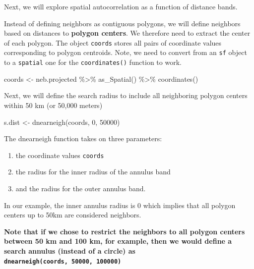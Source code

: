 \documentclass[]{article}
\newenvironment{Shaded}{\begin{snugshade}}{\end{snugshade}}
\newcommand{\DecValTok}[1]{\textcolor[rgb]{0.00,0.00,0.81}{#1}}
\newcommand{\FunctionTok}[1]{\textcolor[rgb]{0.00,0.00,0.00}{#1}}
\newcommand{\NormalTok}[1]{#1}
\newcommand{\OtherTok}[1]{\textcolor[rgb]{0.56,0.35,0.01}{#1}}
\newcommand{\SpecialCharTok}[1]{\textcolor[rgb]{0.00,0.00,0.00}{#1}}
\begin{document}
Next, we will explore spatial autocorrelation as a function of distance
bands.

Instead of defining neighbors as contiguous polygons, we will define
neighbors based on distances to \textbf{polygon centers}. We therefore
need to extract the center of each polygon. The object \texttt{coords}
stores all pairs of coordinate values corresponding to polygon
centroids. Note, we need to convert from an \texttt{sf} object to a
\texttt{spatial} one for the \texttt{coordinates()} function to work.

\begin{Shaded}
\begin{Highlighting}[]
\NormalTok{coords }\OtherTok{\textless{}{-}}\NormalTok{ neb.projected }\SpecialCharTok{\%\textgreater{}\%} \FunctionTok{as\_Spatial}\NormalTok{() }\SpecialCharTok{\%\textgreater{}\%} \FunctionTok{coordinates}\NormalTok{()}
\end{Highlighting}
\end{Shaded}

Next, we will define the search radius to include all neighboring
polygon centers within 50 km (or 50,000 meters)

\begin{Shaded}
\begin{Highlighting}[]
\NormalTok{s.dist  }\OtherTok{\textless{}{-}}  \FunctionTok{dnearneigh}\NormalTok{(coords, }\DecValTok{0}\NormalTok{, }\DecValTok{50000}\NormalTok{)}
\end{Highlighting}
\end{Shaded}

The dnearneigh function takes on three parameters:

\begin{enumerate}
\def\labelenumi{\arabic{enumi}.}
\item
  the coordinate values \texttt{coords}
\item
  the radius for the inner radius of the annulus band
\item
  and the radius for the outer annulus band.
\end{enumerate}

In our example, the inner annulus radius is 0 which implies that all
polygon centers up to 50km are considered neighbors.

\textbf{Note that if we chose to restrict the neighbors to all polygon
centers between 50 km and 100 km, for example, then we would define a
search annulus (instead of a circle) as
\texttt{dnearneigh(coords,\ 50000,\ 100000)}}
\end{document}
